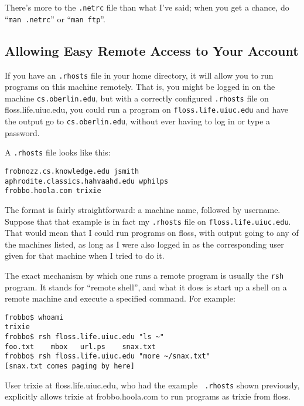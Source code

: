         There's more to the {\tt .netrc} file than what I've said;
when you get a chance, do ``{\tt man~.netrc}'' or ``{\tt man~ftp}''.

\subsection{Allowing Easy Remote Access to Your Account}

        If you have an {\tt .rhosts} file in your home directory, it
will allow you to run programs on this machine remotely.  That is, you
might be logged in on the machine {\tt cs.oberlin.edu}, but with a
correctly configured {\tt .rhosts} file on {floss.life.uiuc.edu}, you
could run a program on {\tt floss.life.uiuc.edu} and have the output
go to {\tt cs.oberlin.edu}, without ever having to log in or type a
password.

        A {\tt .rhosts} file looks like this:

  \begin{screen}
    \begin{verbatim}
frobnozz.cs.knowledge.edu jsmith
aphrodite.classics.hahvaahd.edu wphilps
frobbo.hoola.com trixie
    \end{verbatim}
  \end{screen}

        The format is fairly straightforward: a machine name, followed
by username.  Suppose that that example is in fact my {\tt .rhosts}
file on {\tt floss.life.uiuc.edu}.  That would mean that I could run
programs on floss, with output going to any of the machines listed, as
long as I were also logged in as the corresponding user given for that
machine when I tried to do it.

        The exact mechanism by which one runs a remote program is
usually the {\tt rsh} program.  It stands for ``remote shell'', and
what it does is start up a shell on a remote machine and execute a
specified command.  For example:

\begin{screen}\begin{verbatim}
frobbo$ whoami
trixie
frobbo$ rsh floss.life.uiuc.edu "ls ~"
foo.txt    mbox   url.ps    snax.txt
frobbo$ rsh floss.life.uiuc.edu "more ~/snax.txt"
[snax.txt comes paging by here]
\end{verbatim}\end{screen}

        User trixie at floss.life.uiuc.edu, who had the example {\tt
.rhosts} shown previously, explicitly allows trixie at
frobbo.hoola.com to run programs as trixie from floss.

